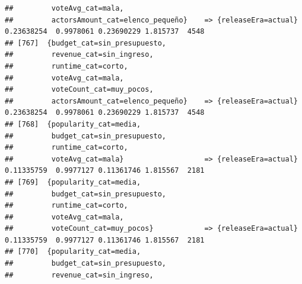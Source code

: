 \documentclass[
]{article}
\begin{document}
\begin{verbatim}
##         voteAvg_cat=mala,                                                                                                       
##         actorsAmount_cat=elenco_pequeño}    => {releaseEra=actual}               0.23638254  0.9978061 0.23690229 1.815737  4548
## [767]  {budget_cat=sin_presupuesto,                                                                                             
##         revenue_cat=sin_ingreso,                                                                                                
##         runtime_cat=corto,                                                                                                      
##         voteAvg_cat=mala,                                                                                                       
##         voteCount_cat=muy_pocos,                                                                                                
##         actorsAmount_cat=elenco_pequeño}    => {releaseEra=actual}               0.23638254  0.9978061 0.23690229 1.815737  4548
## [768]  {popularity_cat=media,                                                                                                   
##         budget_cat=sin_presupuesto,                                                                                             
##         runtime_cat=corto,                                                                                                      
##         voteAvg_cat=mala}                   => {releaseEra=actual}               0.11335759  0.9977127 0.11361746 1.815567  2181
## [769]  {popularity_cat=media,                                                                                                   
##         budget_cat=sin_presupuesto,                                                                                             
##         runtime_cat=corto,                                                                                                      
##         voteAvg_cat=mala,                                                                                                       
##         voteCount_cat=muy_pocos}            => {releaseEra=actual}               0.11335759  0.9977127 0.11361746 1.815567  2181
## [770]  {popularity_cat=media,                                                                                                   
##         budget_cat=sin_presupuesto,                                                                                             
##         revenue_cat=sin_ingreso,                                                                                                

\end{verbatim}
\end{document}
